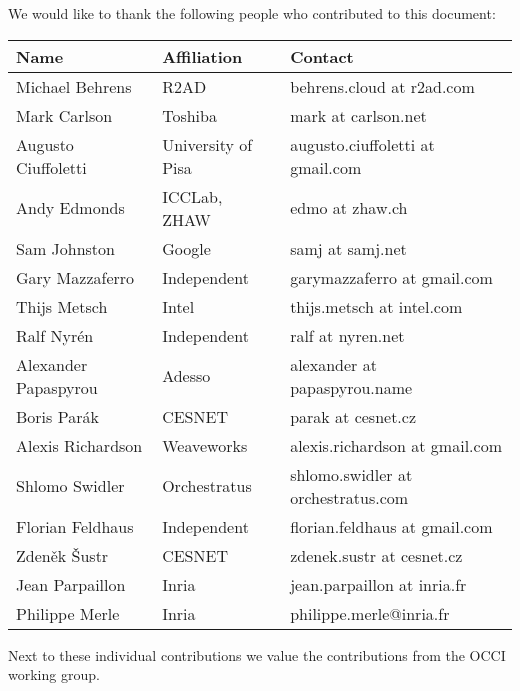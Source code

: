 
We would like to thank the following people who contributed to this
document:

\begin{tabular}{l|p{2in}|p{2in}}
Name & Affiliation & Contact \\
\hline
Michael Behrens & R2AD & behrens.cloud at r2ad.com \\
Mark Carlson & Toshiba & mark at carlson.net \\
Augusto Ciuffoletti & University of Pisa & augusto.ciuffoletti at gmail.com\\
Andy Edmonds & ICCLab, ZHAW & edmo at zhaw.ch \\
Sam Johnston & Google & samj at samj.net \\
Gary Mazzaferro & Independent &  garymazzaferro at gmail.com \\
Thijs Metsch & Intel & thijs.metsch at intel.com \\
Ralf Nyrén & Independent & ralf at nyren.net \\
Alexander Papaspyrou & Adesso & alexander at papaspyrou.name \\
Boris Parák & CESNET & parak at cesnet.cz \\
Alexis Richardson & Weaveworks & alexis.richardson at gmail.com \\
Shlomo Swidler & Orchestratus & shlomo.swidler at orchestratus.com \\
Florian Feldhaus & Independent & florian.feldhaus at gmail.com \\
Zden\v{e}k \v{S}ustr & CESNET & zdenek.sustr at cesnet.cz \\
Jean Parpaillon & Inria & jean.parpaillon at inria.fr \\
Philippe Merle & Inria & philippe.merle@inria.fr \\
\end{tabular}

Next to these individual contributions we value the contributions from
the OCCI working group.
